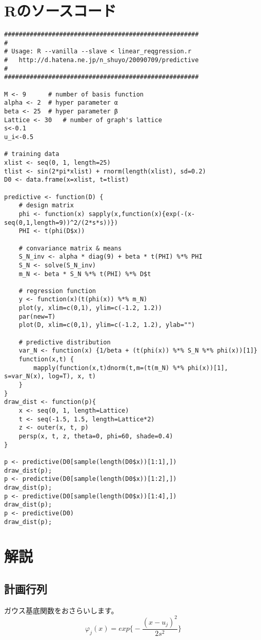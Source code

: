 \documentclass[uplatex]{jsarticle}
\begin{document}
\section{Rのソースコード}
\begin{lstlisting}[basicstyle=\ttfamily\footnotesize, frame=single]
#####################################################
#
# Usage: R --vanilla --slave < linear_reqgression.r
# 	http://d.hatena.ne.jp/n_shuyo/20090709/predictive
#
#####################################################

M <- 9		# number of basis function
alpha <- 2	# hyper parameter α
beta <- 25	# hyper parameter β
Lattice <- 30	# number of graph's lattice
s<-0.1
u_i<-0.5

# training data
xlist <- seq(0, 1, length=25)
tlist <- sin(2*pi*xlist) + rnorm(length(xlist), sd=0.2)
D0 <- data.frame(x=xlist, t=tlist)

predictive <- function(D) {
    # design matrix
    phi <- function(x) sapply(x,function(x){exp(-(x-seq(0,1,length=9))^2/(2*s*s))})
    PHI <- t(phi(D$x))

    # convariance matrix & means
    S_N_inv <- alpha * diag(9) + beta * t(PHI) %*% PHI
    S_N <- solve(S_N_inv)
    m_N <- beta * S_N %*% t(PHI) %*% D$t

    # regression function
    y <- function(x)(t(phi(x)) %*% m_N)
    plot(y, xlim=c(0,1), ylim=c(-1.2, 1.2))
    par(new=T)
    plot(D, xlim=c(0,1), ylim=c(-1.2, 1.2), ylab="")

    # predictive distribution
    var_N <- function(x) {1/beta + (t(phi(x)) %*% S_N %*% phi(x))[1]}
    function(x,t) {
        mapply(function(x,t)dnorm(t,m=(t(m_N) %*% phi(x))[1], s=var_N(x), log=T), x, t)
    }
}
draw_dist <- function(p){
    x <- seq(0, 1, length=Lattice)
    t <- seq(-1.5, 1.5, length=Lattice*2)
    z <- outer(x, t, p)
    persp(x, t, z, theta=0, phi=60, shade=0.4)
}

p <- predictive(D0[sample(length(D0$x))[1:1],])
draw_dist(p);
p <- predictive(D0[sample(length(D0$x))[1:2],])
draw_dist(p);
p <- predictive(D0[sample(length(D0$x))[1:4],])
draw_dist(p);
p <- predictive(D0)
draw_dist(p);
\end{lstlisting}

\section{解説}
\subsection{計画行列}
ガウス基底関数をおさらいします。
\begin{equation}
φ_j(x)=exp\biggl\{-\frac{(x-u_j)^2}{2s^2}\biggl\}
\end{equation}
\end{document}
